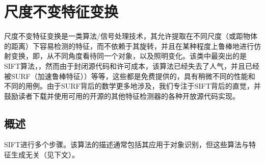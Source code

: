 
\section{尺度不变特征变换}
尺度不变特征变换是一类算法/信号处理技术，其允许提取在不同尺度（或距物体的距离）下容易检测的特征，而不依赖于其旋转，并且在某种程度上鲁棒地进行仿射变换，即，从不同角度看待同一个对象，以及照明变化。该类中最突出的是SIFT算法\cite{lowe1999object}，，然而由于封闭源代码和许可成本，该算法已经失去了人气，并且已经被SURF（加速鲁棒特征））等等，这些都是免费提供的，具有稍微不同的性能和不同的用例。由于SURF背后的数学更多地涉及，我们专注于SIFT背后的直觉，并鼓励读者下载并使用可用的开源的其他特征检测器的各种开放源代码实现。



\subsection{概述}
SIFT进行多个步骤。该算法的描述通常包括其应用于对象识别，但这些算法与特征生成无关（见下文）。

